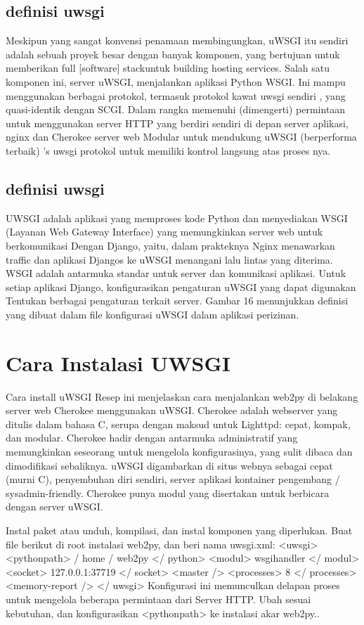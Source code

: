 \subsection{definisi uwsgi}
Meskipun yang sangat konvensi penamaan membingungkan, uWSGI itu sendiri adalah sebuah proyek besar dengan banyak komponen, yang bertujuan untuk memberikan full [software] stackuntuk building hosting services. Salah satu komponen ini, server uWSGI, menjalankan aplikasi Python WSGI. Ini mampu menggunakan berbagai protokol, termasuk protokol kawat uwsgi sendiri , yang quasi-identik dengan SCGI. Dalam rangka memenuhi (dimengerti) permintaan untuk menggunakan server HTTP yang berdiri sendiri di depan server aplikasi, nginx dan Cherokee server web Modular untuk mendukung uWSGI (berperforma terbaik) 's uwsgi protokol untuk memiliki kontrol langsung atas proses nya\cite{dong2015chemdes}.

\subsection{definisi uwsgi}
UWSGI adalah aplikasi yang memproses kode Python dan menyediakan WSGI (Layanan Web
Gateway Interface) yang memungkinkan server web untuk berkomunikasi
Dengan Django, yaitu, dalam prakteknya Nginx menawarkan traffic dan aplikasi Djangos ke uWSGI
menangani lalu lintas yang diterima. WSGI adalah antarmuka standar untuk server
dan komunikasi aplikasi.
Untuk setiap aplikasi Django, konfigurasikan pengaturan uWSGI yang dapat digunakan
Tentukan berbagai pengaturan terkait server. Gambar 16 menunjukkan
definisi yang dibuat dalam file konfigurasi uWSGI dalam aplikasi perizinan\cite{wood2018ccbuilder}.

\section{Cara Instalasi UWSGI}
Cara install uWSGI
Resep ini menjelaskan cara menjalankan web2py di belakang server web Cherokee menggunakan uWSGI.
Cherokee adalah webserver yang ditulis dalam bahasa C, serupa dengan maksud untuk Lighttpd: cepat, kompak, dan modular.
Cherokee hadir dengan antarmuka administratif yang memungkinkan seseorang untuk mengelola konfigurasinya,
yang sulit dibaca dan dimodifikasi sebaliknya. uWSGI digambarkan di situs webnya sebagai cepat
(murni C), penyembuhan diri sendiri, server aplikasi kontainer pengembang / sysadmin-friendly. Cherokee punya
modul yang disertakan untuk berbicara dengan server uWSGI.

Instal paket atau unduh, kompilasi, dan instal komponen yang diperlukan.
Buat file berikut di root instalasi web2py, dan beri nama uwsgi.xml:
<uwsgi>
<pythonpath> / home / web2py </ python>
<modul> wsgihandler </ modul>
<socket> 127.0.0.1:37719 </ socket>
<master />
<processes> 8 </ processes>
<memory-report />
</ uwsgi>
Konfigurasi ini memunculkan delapan proses untuk mengelola beberapa permintaan dari
Server HTTP. Ubah sesuai kebutuhan, dan konfigurasikan <pythonpath> ke instalasi
akar web2py.\cite{mulone2012web2py}.

